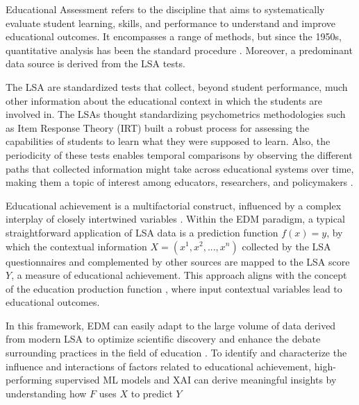 Educational Assessment refers to the discipline that aims to systematically evaluate student learning, skills, and performance to understand and improve educational outcomes. It encompasses a range of methods, but since the 1950s, quantitative analysis has been the standard procedure \cite{noah1969towards}. Moreover, a predominant data source is derived from the LSA tests. 

The LSA are standardized tests that collect, beyond student performance, much other information about the educational context in which the students are involved in. The LSAs thought standardizing psychometrics methodologies such as Item Response Theory (IRT) built a robust process for assessing the capabilities of students to learn what they were supposed to learn. Also, the periodicity of these tests enables temporal comparisons by observing the different paths that collected information might take across educational systems over time, making them a topic of interest among educators, researchers, and policymakers \cite{Johansson2016InternationalConsequences, Kaplan2021BayesianNAEP}.


Educational achievement is a multifactorial construct, influenced by a complex interplay of closely intertwined variables \cite{MartinezAbad2017Data-miningAchievement}. Within the EDM paradigm, a typical straightforward application of LSA data is a prediction function \(f(x) = y\), by which the contextual information \(X = (x^1, x^2, ..., x^n)\) collected by the LSA questionnaires and complemented by other sources are mapped to the LSA score \(Y\), a measure of educational achievement. This approach aligns with the concept of the education production function \cite{bowles1970towards, Scheerens1991ProcessEffectiveness}, where input contextual variables lead to educational outcomes.

In this framework, EDM can easily adapt to the large volume of data derived from modern LSA to optimize scientific discovery and enhance the debate surrounding practices in the field of education \cite{Gabriel2018ALiteracy, Gomes2020StudentBrazil,Martinez-Abad2020EducationalAssessment, Lezhnina2022CombiningPISA, Martinez-Abad2018BigEducation}. To identify and characterize the influence and interactions of factors related to educational achievement, high-performing supervised ML models and XAI can derive meaningful insights by understanding how \(F\) uses \(X\) to predict \(Y\) \cite{Chen2021SynergisticLiteracy, Dong2019AnApproaches, Gorostiaga2016OnSpain, Hu2022DiscoveryApproach, Martinez-Abad2020EducationalAssessment} 

